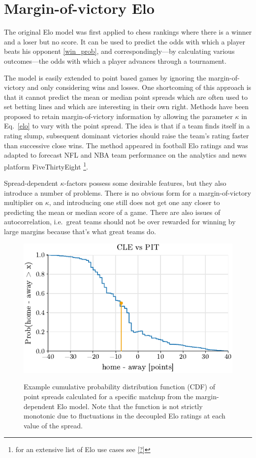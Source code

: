 \documentclass[aps,prc,reprint,amsmath,superscriptaddress]{revtex4-1}
\begin{document}
\section{Margin-of-victory Elo}

The original Elo model was first applied to chess rankings where there is a winner and a loser but no score.
It can be used to predict the odds with which a player beats his opponent \eqref{win_prob}, and correspondingly---by calculating various outcomes---the odds with which a player advances through a tournament. 

The model is easily extended to point based games by ignoring the margin-of-victory and only considering wins and losses.
One shortcoming of this approach is that it cannot predict the mean or median point spreads which are often used to set betting lines and which are interesting in their own right.
Methods have been proposed to retain margin-of-victory information by allowing the parameter $\kappa$ in Eq.~\eqref{elo} to vary with the point spread.
The idea is that if a team finds itself in a rating slump, subsequent dominant victories should raise the team's rating faster than successive close wins.
The method appeared in football Elo ratings \cite{?} and was adapted to forecast NFL and NBA team performance on the analytics and news platform FiveThirtyEight \footnote{for an extensive list of Elo use cases see \ref{?}}.

Spread-dependent $\kappa$-factors possess some desirable features, but they also introduce a number of problems.
There is no obvious form for a margin-of-victory multiplier on $\kappa$, and introducing one still does not get one any closer to predicting the mean or median score of a game.
There are also issues of autocorrelation, i.e.\ great teams should not be over rewarded for winning by large margins because that's what great teams do.

\begin{figure}[b]
  \includegraphics{example_distribution}
  \label{fig:example}
  \caption{Example cumulative probability distribution function (CDF) of point spreads calculated for a specific matchup from the margin-dependent Elo model. Note that the function is not strictly monotonic due to fluctuations in the decoupled Elo ratings at each value of the spread.}
\end{figure}
\end{document}
